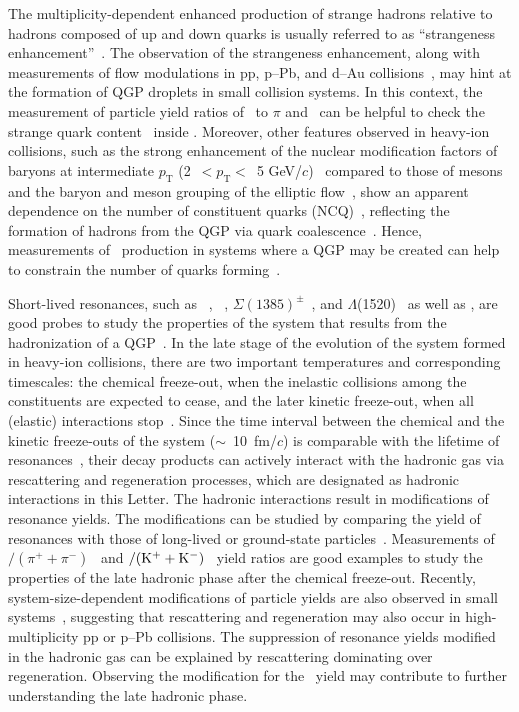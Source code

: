 The multiplicity-dependent enhanced production of strange hadrons relative to hadrons composed of up and down quarks is usually referred to as ``strangeness enhancement''~\cite{ALICE:2016fzo}. The observation of the strangeness enhancement, along with measurements of flow modulations in pp, p--Pb, and d--Au collisions~\cite{PHENIX:2018lia, ALICE:2021nir, ATLAS:2016yzd}, may hint at the formation of QGP droplets in small collision systems. In this context, the measurement of particle yield ratios of \fzero~to $\pi$ and \kstar~can be helpful to check the strange quark content~\cite{LHCb:2014ooi, LHCb:2014vbo} inside \fzero. Moreover, other features observed in heavy-ion collisions, such as the strong enhancement of the nuclear modification factors of baryons at intermediate $p_{\mathrm{T}}$ (2~$<p_{\mathrm{T}}<$~5 GeV/$c$)~\cite{Fries:2003vb, ALICE:2022wpn} compared to those of mesons and the baryon and meson grouping of the elliptic flow~\cite{Wang:2022det}, show an apparent dependence on the number of constituent quarks (NCQ)~\cite{Wang:2022det}, reflecting the formation of hadrons from the QGP via quark coalescence~\cite{Fries:2003vb}. Hence, measurements of \fzero~production in systems where a QGP may be created can help to constrain the number of quarks forming~\fzero.

Short-lived resonances, such as \rhoz~\cite{ALICE:2018qdv}, \kstar~\cite{ALICE:2019etb, ALICE:2016sak}, $\Sigma(1385)^{\pm}$~\cite{ALICE:2022zuc}, and $\Lambda$(1520)~\cite{ALICE:2018ewo} as well as \fzero, are good probes to study the properties of the system that results from the hadronization of a QGP~\cite{Bierlich:2021poz, Knospe:2015nva}. In the late stage of the evolution of the system formed in heavy-ion collisions, there are two important temperatures and corresponding timescales: the chemical freeze-out, when the inelastic collisions among the constituents are expected to cease, and the later kinetic freeze-out, when all (elastic) interactions stop~\cite{Song:1996ik}. Since the time interval between the chemical and the kinetic freeze-outs of the system ($\sim$~10~fm/$c$) is comparable with the lifetime of resonances~\cite{ALICE:2011dyt, ALICE:2019xyr}, their decay products can actively interact with the hadronic gas via rescattering and regeneration processes, which are designated as hadronic interactions in this Letter. The hadronic interactions result in modifications of resonance yields. The modifications can be studied by comparing the yield of resonances with those of long-lived or ground-state particles~\cite{ALICE:2018pal}. Measurements of \rhoz$/(\pi^{+}+\pi^{-})$~\cite{ALICE:2018qdv} and \kstar$\rm{}/(K^{+}+K^{-})$~\cite{ALICE:2019etb, ALICE:2016sak} yield ratios are good examples to study the properties of the late hadronic phase after the chemical freeze-out. Recently, system-size-dependent modifications of particle yields are also observed in small systems~\cite{ALICE:2016sak, ALICE:2019etb}, suggesting that rescattering and regeneration may also occur in high-multiplicity pp or p--Pb collisions. The suppression of resonance yields modified in the hadronic gas can be explained by rescattering dominating over regeneration. Observing the modification for the \fzero~yield may contribute to further understanding the late hadronic phase.


